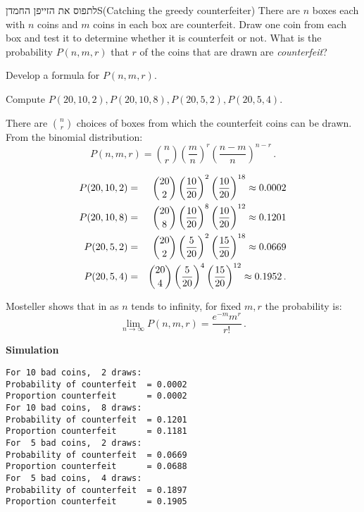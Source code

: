 
\begin{prob}{לתפוס את הזייפן החמדן}{S}{(Catching the greedy counterfeiter)}
There are $n$ boxes each with $n$ coins and $m$ coins in each box are counterfeit. Draw one coin from each box and test it to determine whether it is counterfeit or not. What is the probability $P(n,m,r)$ that $r$ of the coins that are drawn are \emph{counterfeit}?

 Develop a formula for $P(n,m,r)$.

 Compute $P(20,10,2), P(20,10,8), P(20,5,2), P(20,5,4)$.
\end{prob}

\solution{}

There are ${n\choose r}$ choices of boxes from which the counterfeit coins can be drawn. From the binomial distribution:
\[
P(n,m,r) = {n \choose r} \left(\frac{m}{n}\right)^r \left(\frac{n-m}{n}\right)^{n-r}\,.
\]

\begin{eqnarray*}
P(20,10,2) &=& \displaystyle{20 \choose 2} \left(\frac{10}{20}\right)^2 \left(\frac{10}{20}\right)^{18}\approx 0.0002\\
P(20,10,8) &=& \displaystyle{20 \choose 8} \left(\frac{10}{20}\right)^{8} \left(\frac{10}{20}\right)^{12}\approx 0.1201\\
P(20,5,2)&=&\displaystyle{20 \choose 2} \left(\frac{5}{20}\right)^2 \left(\frac{15}{20}\right)^{18}\approx 0.0669\\
P(20,5,4)&=&\displaystyle{20 \choose 4} \left(\frac{5}{20}\right)^{4} \left(\frac{15}{20}\right)^{12}\approx 0.1952\,.
\end{eqnarray*}

Mosteller shows that in as $n$ tends to infinity, for fixed $m,r$ the probability is:
\begin{equation}\label{eq.bin-limit}
\lim_{n\rightarrow \infty}P(n,m,r) = \frac{e^{-m}m^r}{r!}\,.
\end{equation}

\textbf{Simulation}
\begin{verbatim}
For 10 bad coins,  2 draws:
Probability of counterfeit  = 0.0002
Proportion counterfeit      = 0.0002
For 10 bad coins,  8 draws:
Probability of counterfeit  = 0.1201
Proportion counterfeit      = 0.1181
For  5 bad coins,  2 draws:
Probability of counterfeit  = 0.0669
Proportion counterfeit      = 0.0688
For  5 bad coins,  4 draws:
Probability of counterfeit  = 0.1897
Proportion counterfeit      = 0.1905
\end{verbatim}

